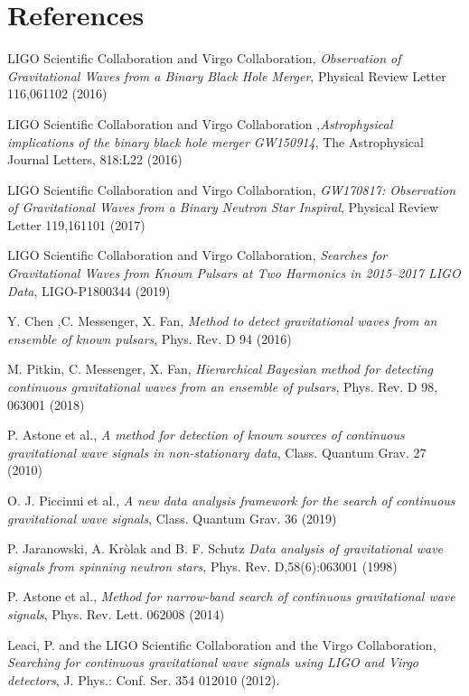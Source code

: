 \documentclass[11pt,a4paper,final]{iopart}
\begin{document}
\section*{References}
\begin{thebibliography}{10}

  LIGO Scientific Collaboration and Virgo Collaboration, \emph{Observation of Gravitational Waves from a Binary Black Hole Merger}, Physical Review Letter 116,061102 (2016)
 
 LIGO Scientific Collaboration and Virgo Collaboration ,\emph{Astrophysical implications of the binary black hole merger GW150914}, The Astrophysical Journal Letters, 818:L22 (2016) 

 LIGO Scientific Collaboration and Virgo Collaboration, \emph{GW170817: Observation of Gravitational Waves from a Binary Neutron Star Inspiral}, Physical Review Letter 119,161101 (2017)

 LIGO Scientific Collaboration and Virgo Collaboration, \emph{Searches for Gravitational Waves from Known Pulsars at Two Harmonics in 2015–2017 LIGO Data}, LIGO-P1800344 (2019)

Y. Chen ,C. Messenger, X. Fan, \emph{Method to detect gravitational waves from an ensemble of known pulsars}, Phys. Rev. D 94 (2016)

  M. Pitkin, C. Messenger, X. Fan, \emph{Hierarchical Bayesian method for detecting continuous gravitational waves from an ensemble of pulsars}, Phys. Rev. D 98, 063001 (2018)

 P. Astone et al., \emph{A method for detection of known sources of continuous gravitational wave signals in non-stationary data}, Class. Quantum Grav. 27 (2010) 

 O. J. Piccinni et al., \emph{A new data analysis framework for the search of continuous gravitational wave signals}, Class. Quantum Grav. 36 (2019)

 P. Jaranowski, A. Kròlak and B. F. Schutz \emph{Data analysis of gravitational wave signals from spinning neutron stars}, Phys. Rev. D,58(6):063001 (1998)

 P. Astone et al., \emph{Method for narrow-band search of continuous gravitational wave signals}, Phys. Rev. Lett. 062008 (2014)

Leaci, P. and the LIGO Scientific Collaboration and the Virgo Collaboration, \emph{Searching for continuous gravitational wave signals using
LIGO and Virgo detectors}, J. Phys.: Conf. Ser. 354 012010 (2012).


\end{thebibliography}
\end{document}
